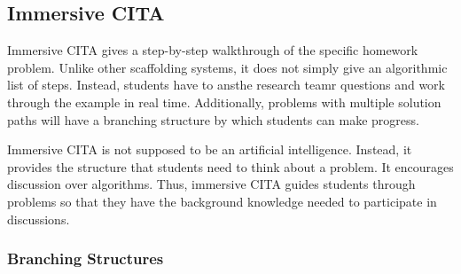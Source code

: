 \subsection{Immersive CITA}

Immersive CITA gives a step-by-step walkthrough of the specific homework problem. Unlike other scaffolding systems, it does not simply give an algorithmic list of steps. Instead, students have to ansthe research teamr questions and work through the example in real time. Additionally, problems with multiple solution paths will have a branching structure by which students can make progress.

Immersive CITA is not supposed to be an artificial intelligence. Instead, it provides the structure that students need to think about a problem. It encourages discussion over algorithms. Thus, immersive CITA guides students through problems so that they have the background knowledge needed to participate in discussions.

\subsubsection{Branching Structures}

\pagebreak

